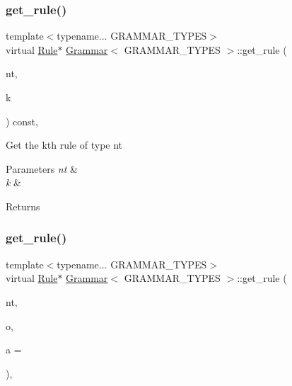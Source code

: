 \subsubsection{\texorpdfstring{get\+\_\+rule()}{get\_rule()}\hspace{0.1cm}{\footnotesize\ttfamily [1/4]}}
{\footnotesize\ttfamily template$<$typename... G\+R\+A\+M\+M\+A\+R\+\_\+\+T\+Y\+P\+ES$>$ \\
virtual \hyperlink{class_rule}{Rule}$\ast$ \hyperlink{class_grammar}{Grammar}$<$ G\+R\+A\+M\+M\+A\+R\+\_\+\+T\+Y\+P\+ES $>$\+::get\+\_\+rule (\begin{DoxyParamCaption}\item[{const \hyperlink{_nonterminal_8h_a1c5bfe9b903f69c83bbde5da7035fef3}{nonterminal\+\_\+t}}]{nt,  }\item[{size\+\_\+t}]{k }\end{DoxyParamCaption}) const\hspace{0.3cm}{\ttfamily [inline]}, {\ttfamily [virtual]}}

Get the k\textquotesingle{}th rule of type nt 
\begin{DoxyParams}{Parameters}
{\em nt} & \\
\hline
{\em k} & \\
\hline
\end{DoxyParams}
\begin{DoxyReturn}{Returns}

\end{DoxyReturn}
\mbox{\label{class_grammar_a57835af24b91d1c193f2906b43282350}} 
\subsubsection{\texorpdfstring{get\+\_\+rule()}{get\_rule()}\hspace{0.1cm}{\footnotesize\ttfamily [2/4]}}
{\footnotesize\ttfamily template$<$typename... G\+R\+A\+M\+M\+A\+R\+\_\+\+T\+Y\+P\+ES$>$ \\
virtual \hyperlink{class_rule}{Rule}$\ast$ \hyperlink{class_grammar}{Grammar}$<$ G\+R\+A\+M\+M\+A\+R\+\_\+\+T\+Y\+P\+ES $>$\+::get\+\_\+rule (\begin{DoxyParamCaption}\item[{const \hyperlink{_nonterminal_8h_a1c5bfe9b903f69c83bbde5da7035fef3}{nonterminal\+\_\+t}}]{nt,  }\item[{const \hyperlink{_instruction_8h_af2fb7c87c5854c5733d7bb0506b06de7}{Builtin\+Op}}]{o,  }\item[{const int}]{a = {} }\end{DoxyParamCaption})\hspace{0.3cm}{\ttfamily [inline]}, {\ttfamily [virtual]}}

